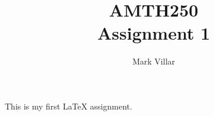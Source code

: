 \documentclass[11pt,a4paper]{article}
\title{AMTH250 \\ Assignment 1}
\author{Mark Villar}
\begin{document}
\maketitle

This is my first \LaTeX{} assignment.
\end{document}
